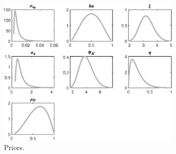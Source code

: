  
\begin{figure}[H]
\centering
\includegraphics[width=0.80\textwidth]{BRS_growth_KPR_D/graphs/BRS_growth_KPR_D_Priors1}
\caption{Priors.}\label{Fig:Priors:1}
\end{figure}
 
